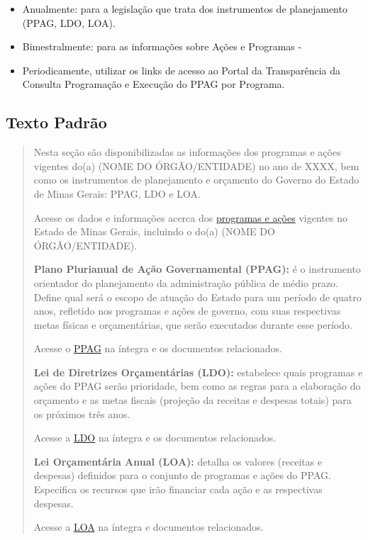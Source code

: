 \documentclass[]{book}
\providecommand{\tightlist}{%
  \setlength{\itemsep}{0pt}\setlength{\parskip}{0pt}}
\begin{document}
\begin{itemize}
\tightlist
\item
  Anualmente: para a legislação que trata dos instrumentos de planejamento (PPAG, LDO, LOA).
\item
  Bimestralmente: para as informações sobre Ações e Programas -
\item
  Periodicamente, utilizar os links de acesso ao Portal da Transparência da Consulta Programação e Execução do PPAG por Programa.
\end{itemize}

\hypertarget{texto-padruxe3o-3}{%
\subsection{Texto Padrão}\label{texto-padruxe3o-3}}

\begin{quote}
Nesta seção são disponibilizadas as informações dos programas e ações vigentes do(a) (NOME DO ÓRGÃO/ENTIDADE) no ano de XXXX, bem como os instrumentos de planejamento e orçamento do Governo do Estado de Minas Gerais: PPAG, LDO e LOA.

Acesse os dados e informações acerca dos \href{http://www.transparencia.mg.gov.br/planejamento-e-resultados/planejamento-e-monitoramento/programacao-execucao-ppag-programa/ppagprograma-programas/4/2019/0/0}{programas e ações} vigentes no Estado de Minas Gerais, incluindo o do(a) (NOME DO ÓRGÃO/ENTIDADE).

\textbf{Plano Plurianual de Ação Governamental (PPAG):} é o instrumento orientador do planejamento da administração pública de médio prazo. Define qual será o escopo de atuação do Estado para um período de quatro anos, refletido nos programas e ações de governo, com suas respectivas metas físicas e orçamentárias, que serão executados durante esse período.

Acesse o \href{http://transparencia.mg.gov.br/planejamento-e-resultados}{PPAG} na íntegra e os documentos relacionados.

\textbf{Lei de Diretrizes Orçamentárias (LDO):} estabelece quais programas e ações do PPAG serão prioridade, bem como as regras para a elaboração do orçamento e as metas fiscais (projeção da receitas e despesas totais) para os próximos três anos.

Acesse a \href{http://transparencia.mg.gov.br/planejamento-e-resultados}{LDO} na íntegra e os documentos relacionados.

\textbf{Lei Orçamentária Anual (LOA):} detalha os valores (receitas e despesas) definidos para o conjunto de programas e ações do PPAG. Especifica os recursos que irão financiar cada ação e as respectivas despesas.

Acesse a \href{http://transparencia.mg.gov.br/planejamento-e-resultados}{LOA} na íntegra e documentos relacionados.
\end{quote}
\end{document}
